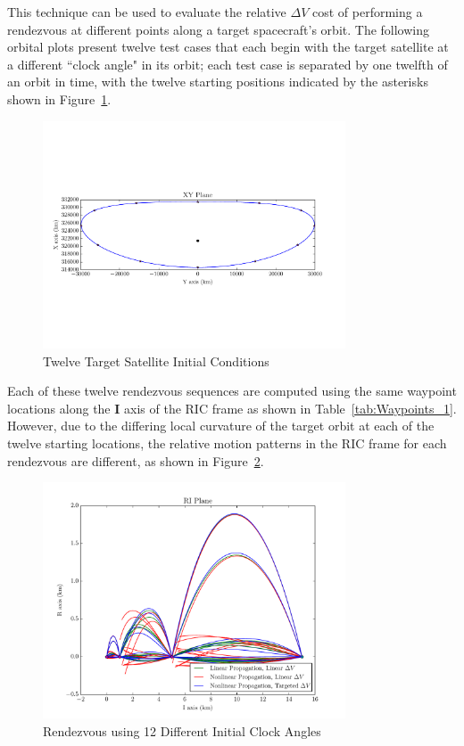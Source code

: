 \documentclass[letterpaper, preprint, paper,11pt]{AAS}	%
\begin{document}
This technique can be used to evaluate the relative \(\Delta V\) cost of performing a rendezvous at different points along a target spacecraft's orbit.  The following orbital plots present twelve test cases that each begin with the target satellite at a different ``clock angle" in its orbit; each test case is separated by one twelfth of an orbit in time, with the twelve starting positions indicated by the asterisks shown in Figure~\ref{fig:FullOrbit_2}.

\begin{figure}[htb] 
	\begin{center}
		\includegraphics[width=0.8\textwidth]{Target_Full_Orbit_2}
		\caption{Twelve Target Satellite Initial Conditions}
		\label{fig:FullOrbit_2}
	\end{center}
\end{figure}

Each of these twelve rendezvous sequences are computed using the same waypoint locations along the \(\mathbf{I}\) axis of the RIC frame as shown in Table~\ref{tab:Waypoints_1}.  However, due to the differing local curvature of the target orbit at each of the twelve starting locations, the relative motion patterns in the RIC frame for each rendezvous are different, as shown in Figure~\ref{fig:RIC_2}.  

\begin{figure}[htb] 
	\begin{center}
		\includegraphics[width=0.8\textwidth]{RIC_2}
		\caption{Rendezvous using 12 Different Initial Clock Angles}
		\label{fig:RIC_2}
	\end{center}
\end{figure}
\end{document}
